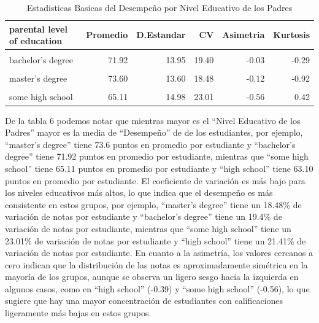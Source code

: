 \documentclass[
]{article}
\begin{document}
\begin{table}[!h]
\centering
\caption{\label{tab:caculos basicos}Estadisticas Basicas del Desempeño por Nivel Educativo de los Padres}
\centering
\begin{tabular}[t]{lrrrrr}
\toprule
parental level of education & Promedio & D.Estandar & CV & Asimetria & Kurtosis\\
\midrule
\cellcolor{gray!10}{associate's degree} & \cellcolor{gray!10}{69.57} & \cellcolor{gray!10}{13.67} & \cellcolor{gray!10}{19.65} & \cellcolor{gray!10}{-0.10} & \cellcolor{gray!10}{-0.63}\\
bachelor's degree & 71.92 & 13.95 & 19.40 & -0.03 & -0.29\\
\cellcolor{gray!10}{high school} & \cellcolor{gray!10}{63.10} & \cellcolor{gray!10}{13.51} & \cellcolor{gray!10}{21.41} & \cellcolor{gray!10}{-0.39} & \cellcolor{gray!10}{0.19}\\
master's degree & 73.60 & 13.60 & 18.48 & -0.12 & -0.92\\
\cellcolor{gray!10}{some college} & \cellcolor{gray!10}{68.48} & \cellcolor{gray!10}{13.71} & \cellcolor{gray!10}{20.02} & \cellcolor{gray!10}{-0.38} & \cellcolor{gray!10}{0.25}\\
\addlinespace
some high school & 65.11 & 14.98 & 23.01 & -0.56 & 0.42\\
\bottomrule
\end{tabular}
\end{table}

De la tabla 6 podemos notar que mientras mayor es el ``Nivel Educativo
de los Padres'' mayor es la media de ``Desempeño'' de de los
estudiantes, por ejemplo, ``master's degree'' tiene 73.6 puntos en
promedio por estudiante y ``bachelor's degree'' tiene 71.92 puntos en
promedio por estudiante, mientras que ``some high school'' tiene 65.11
puntos en promedio por estudiante y ``high school'' tiene 63.10 puntos
en promedio por estudiante. El coeficiente de variación es más bajo para
los niveles educativos más altos, lo que indica que el desempeño es más
consistente en estos grupos, por ejemplo, ``master's degree'' tiene un
18.48\% de variación de notas por estudiante y ``bachelor's degree''
tiene un 19.4\% de variación de notas por estudiante, mientras que
``some high school'' tiene un 23.01\% de variación de notas por
estudiante y ``high school'' tiene un 21.41\% de variación de notas por
estudiante. En cuanto a la asimetría, los valores cercanos a cero
indican que la distribución de las notas es aproximadamente simétrica en
la mayoría de los grupos, aunque se observa un ligero sesgo hacia la
izquierda en algunos casos, como en ``high school'' (-0.39) y ``some
high school'' (-0.56), lo que sugiere que hay una mayor concentración de
estudiantes con calificaciones ligeramente más bajas en estos grupos.
\end{document}
